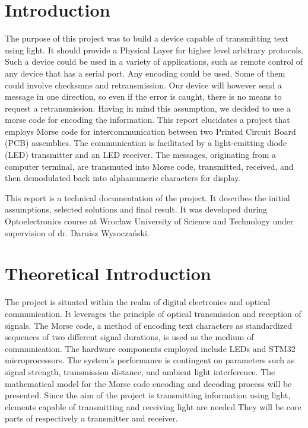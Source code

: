 \documentclass[12pt]{article}
\begin{document}
	\section{Introduction}
  The purpose of this project was to build a device capable of transmitting text using light. It should provide a Physical Layer for higher level arbitrary protocols.
  Such a device could be used in a variety of applications, such as remote control of any device that has a serial port.
  Any encoding could be used. Some of them could involve checksums and retransmission. Our device will however send a message in one direction, so even if the error is caught,
  there is no means to request a retransmission. Having in mind this assumption, we decided to use a morse code for encoding the information.
  This report elucidates a project that employs Morse code for intercommunication between two Printed Circuit Board (PCB) assemblies. The communication is facilitated by a light-emitting 
  diode (LED) transmitter and an LED receiver. The messages, originating from a computer terminal, are transmuted into Morse code, transmitted, received, and then demodulated back into alphanumeric characters for display.

  This report is a technical documentation of the project. It describes the initial assumptions, selected solutions and final result.
  It was developed during Optoelectronics course at Wrocław University of Science and Technology under supervision of dr. Daruisz Wysoczański.

	
	\section{Theoretical Introduction}
 The project is situated within the realm of digital electronics and optical communication. It leverages the principle of optical transmission and reception of signals. The Morse code, a method of encoding text characters as standardized 
  sequences of two different signal durations, is used as the medium of communication. The hardware components employed include LEDs and STM32 microprocessors. The system's performance is contingent on parameters such as signal strength, 
  transmission distance, and ambient light interference. The mathematical model for the Morse code encoding and decoding process will be presented.
  Since the aim of the project is transmitting information using light, elements capable of transmitting and receiving light are needed
  They will be core parts of respectively a transmitter and receiver.
\end{document}
